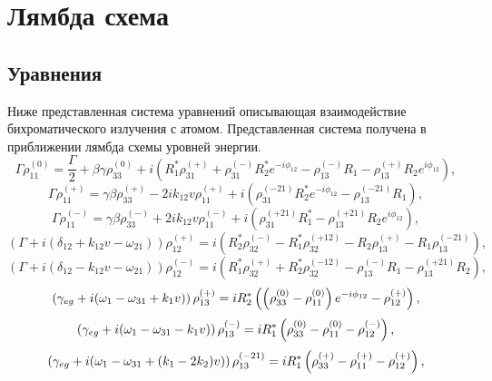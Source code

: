 \chapter{Лямбда схема}\label{ch:ch1}

\section{Уравнения}\label{sec:ch1/sec1}

Ниже представленная система уравнений описывающая взаимодействие бихроматического излучения с атомом.
 Представленная система получена в приближении лямбда схемы уровней энергии.
\begin{equation}
    \Gamma\rho_{11}^{(0)}=\frac{\Gamma}{2}+\beta\gamma\rho_{33}^{(0)}+i\left( R_1^{*}\rho_{31}^{(+)}+\rho_{31}^{(-)}R_2^{*}e^{-i\phi_{12}} - \rho_{13}^{(-)}R_1-\rho_{13}^{(+)}R_2e^{i\phi_{12}} \right),
\end{equation}
\begin{equation}
    \Gamma\rho_{11}^{(+)} = \gamma\beta\rho_{33}^{(+)}-2ik_{12}v\rho_{11}^{(+)}+i\left( \rho_{31}^{(-21)}R_2^{*}e^{-i\phi_{12}}-\rho_{13}^{(-21)}R_1 \right),
\end{equation}
\begin{equation}
    \Gamma\rho_{11}^{(-)} = \gamma\beta\rho_{33}^{(-)}+2ik_{12}v\rho_{11}^{(-)}+i\left( \rho_{31}^{(+21)}R_1^{*}-\rho_{13}^{(+21)}R_2e^{i\phi_{12}} \right),
\end{equation}
\begin{equation}
    \left(\Gamma+i(\delta_{12}+k_{12}v-\omega_{21})\right)\rho_{12}^{(+)}=i\left( R_2^{*}\rho_{32}^{(-)}-R_1^{*}\rho_{32}^{(+12)}-R_2\rho_{13}^{(+)}-R_1\rho_{13}^{(-21)} \right),
\end{equation}
\begin{equation}
    \left(\Gamma+i(\delta_{12}-k_{12}v-\omega_{21})\right)\rho_{12}^{(-)}=i\left( R_1^*\rho_{32}^{(+)}+R_2^*\rho_{32}^{(-12)}-\rho_{13}^{(-)}R_1-\rho_{13}^{(+21)}R_2 \right),
\end{equation}
\begin{equation}
    \left( \gamma_{eg}+i(\omega_1-\omega_{31}+k_1v) \right)\rho^{(+)}_{13}=iR_2^*\left(\left(\rho^{(0)}_{33}-\rho^{(0)}_{11}\right)e^{-i\phi_{12}}-\rho^{(+)}_{12}\right),
\end{equation}
\begin{equation}
    \left(\gamma_{eg}+i(\omega_1-\omega_{31}-k_1v)\right)\rho^{(-)}_{13}=iR_1^*\left(\rho^{(0)}_{33}-\rho^{(0)}_{11}-\rho^{(-)}_{12}\right),
\end{equation}
\begin{equation}
    \left(\gamma_{eg}+i(\omega_1-\omega_{31}+(k_1-2k_2)v)\right)\rho^{(-21)}_{13}=iR_1^*\left(\rho^{(+)}_{33}-\rho^{(+)}_{11}-\rho^{(+)}_{12}\right),
\end{equation}
